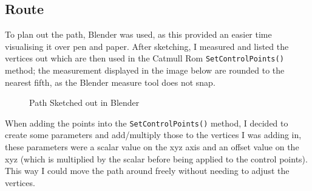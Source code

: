 \documentclass[10pt]{report}
\begin{document}
\subsection*{Route}
To plan out the path, Blender was used, as this provided an easier time visualising it over pen and paper. After sketching, I measured and listed the vertices out which are then used in the Catmull Rom \colorbox{mygrey}{\lstinline{SetControlPoints()}} method; the measurement displayed in the image below are rounded to the nearest fifth, as the Blender measure tool does not snap. 
\begin{figure}[H]
    \centering
    \caption{Path Sketched out in Blender}
\end{figure}

When adding the points into the \colorbox{mygrey}{\lstinline{SetControlPoints()}} method, I decided to create some parameters and add/multiply those to the vertices I was adding in, these parameters were a scalar value on the xyz axis and an offset value on the xyz (which is multiplied by the scalar before being applied to the control points). This way I could move the path around freely without needing to adjust the vertices.



\end{document}
